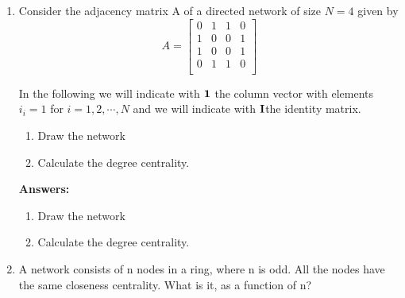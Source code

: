 \documentclass{amsart}
\theoremstyle{definition}
\theoremstyle{remark}
\numberwithin{equation}{section}
\begin{document}
\begin{enumerate}
\begin{enumerate}
\end{enumerate}
\clearpage

\item 
Consider the adjacency matrix A of a directed network of size $N = 4$ given by \vspace{0.2cm}
\begin{equation*}
{A}  = \left\lbrack\begin{array}{cccc}
0 & 1 & 1 & 0 \\
1 & 0 & 0 & 1 \\
1 & 0 & 0 & 1 \\
0 & 1 & 1 & 0 \\
\end{array}\right\rbrack
\end{equation*}

\vspace{0.2cm}
In the following we will indicate with ${\bf 1}$ the column vector with elements $i_i = 1$ for $i = 1, 2, \cdots, N$ and we will indicate with ${\bf I}$the identity matrix. \vspace{0.2cm}
\begin{enumerate}
\item Draw the network
\item Calculate the degree centrality.
\end{enumerate}
\vspace{1cm}

\textbf{Answers:}

\begin{enumerate}
\item Draw the network \vspace{0.2cm}

\vspace{0.2cm}
\item Calculate the degree centrality. \vspace{0.2cm}

\vspace{0.2cm}
\end{enumerate}
\clearpage

\item A network consists of n nodes in a ring, where n is odd. All the nodes have the same closeness centrality. What is it, as a function of n? \vspace{0.2cm}



\end{enumerate}
\end{document}
